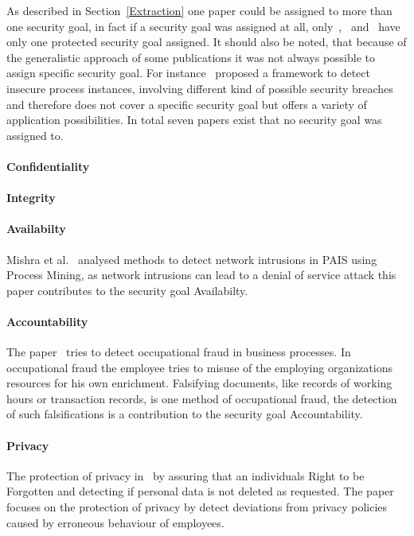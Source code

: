 \documentclass[runningheads]{llncs}
\begin{document}
As described in Section~\ref{Extraction} one paper could be assigned to more than one security goal, in fact if a security goal was assigned at all, 
only~\cite{Zaman20192982},~\cite{MozafariMehr202182} and~\cite{Sarno2020} have only one protected security goal assigned.
It should also be noted, that because of the generalistic approach of some publications it was not always possible to assign specific security goal. For instance~\cite{Fazzinga2020} proposed a framework to detect insecure process instances, involving different 
kind of possible security breaches and therefore does not cover a specific security goal but offers a variety of application possibilities. 
In total seven papers exist that no security goal was assigned to.
\paragraph{Confidentiality}
\paragraph{Integrity}
\paragraph{Availabilty} Mishra et al.~\cite{Mishra2018613} analysed methods to detect network intrusions in PAIS using Process Mining, as network intrusions can lead to a denial of service attack this paper contributes to the security goal Availabilty.
\paragraph{Accountability} The paper~\cite{Mardani2013} tries to detect occupational fraud in business processes. In occupational fraud the employee tries to misuse of the employing organizations resources for his own enrichment. Falsifying documents,
like records of working hours or transaction records, is one method of occupational fraud, the detection of such falsifications is a contribution to the security goal Accountability.
\paragraph{Privacy} The protection of privacy in~\cite{Zaman20192982} by assuring that an individuals Right to be Forgotten and detecting if personal data is not deleted as requested. The paper~\cite{MozafariMehr202182} focuses on the protection of privacy by
detect deviations from privacy policies caused by erroneous behaviour of employees.
\end{document}
